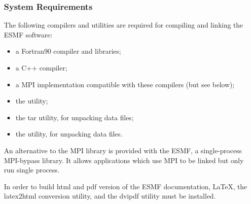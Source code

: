
\subsubsection{System Requirements}
\label{sec:systemreq}

The following compilers and utilities are required for compiling and 
linking the ESMF software:
\begin{itemize}
\item a Fortran90 compiler and libraries;
\item a C++ compiler;
\item a MPI implementation compatible with these compilers (but see below);
\item the  utility; 
\item the tar utility, for unpacking data files;
\item the  utility, for unpacking data files.
\end{itemize} 

An alternative to the MPI library is provided with the ESMF,
a single-process MPI-bypass library.  It allows applications which
use MPI to be linked but only run single process.

In order to build html and pdf version of the ESMF documentation, 
\LaTeX, the latex2html conversion utility, and the dvipdf 
utility must be installed.







